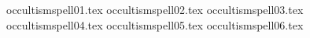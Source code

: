 

\tablepassive{\occultismpassive}{\occultismpassivedef}
\tablelabels
{occultismspell01.tex}%
\spellrule
{occultismspell02.tex}%
\spellrule
{occultismspell03.tex}%
\spellrule
{occultismspell04.tex}%
\spellrule
{occultismspell05.tex}%
\spellrule
{occultismspell06.tex}%
\closetable{}
